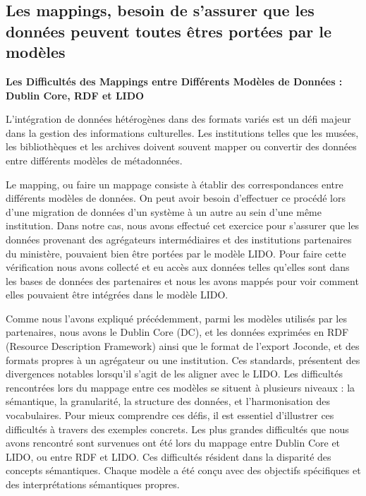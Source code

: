 \subsection{Les mappings, besoin de s'assurer que les données peuvent toutes
êtres portées par le modèles}

\textbf{Les Difficultés des Mappings entre Différents Modèles de Données : Dublin Core, RDF et LIDO }\newline

L’intégration de données hétérogènes dans des formats variés est un défi majeur dans la gestion des informations culturelles. Les institutions telles que les musées, les bibliothèques et les archives doivent souvent mapper ou convertir des données entre différents modèles de métadonnées.\newline

Le mapping, ou faire un mappage consiste à établir des correspondances entre différents modèles de données. On peut avoir besoin d’effectuer ce procédé lors d’une migration de données d’un système à un autre au sein d’une même institution. Dans notre cas, nous avons effectué cet exercice pour s’assurer que les données provenant des agrégateurs intermédiaires et des institutions partenaires du ministère, pouvaient bien être portées par le modèle LIDO. Pour faire cette vérification nous avons collecté et eu accès aux données telles qu’elles sont dans les bases de données des partenaires et nous les avons mappés pour voir comment elles pouvaient être intégrées dans le modèle LIDO. \newline

Comme nous l’avons expliqué précédemment, parmi les modèles utilisés par les partenaires, nous avons le  Dublin Core (DC), et les données exprimées en RDF (Resource Description Framework) ainsi que le format de l’export Joconde, et des formats propres à un agrégateur ou une institution.
Ces standards, présentent des divergences notables lorsqu'il s'agit de les aligner avec le LIDO. Les difficultés rencontrées lors du mappage entre ces modèles se situent à plusieurs niveaux : la sémantique, la granularité, la structure des données, et l'harmonisation des 
vocabulaires. Pour mieux comprendre ces défis, il est essentiel d’illustrer ces difficultés à travers des exemples concrets.
Les plus grandes difficultés que nous avons rencontré sont survenues ont été lors du mappage entre Dublin Core et LIDO, ou entre RDF et LIDO. Ces difficultés résident dans la disparité des concepts sémantiques. Chaque modèle a été conçu avec des objectifs spécifiques et des interprétations sémantiques propres. \newline

